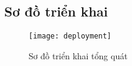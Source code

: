 \subsection{Sơ đồ triển khai}
\begin{figure}[h!]\fontsize{13px}{13px}\selectfont
	\begin{center}	
		\texttt{[image: deployment]}
		\caption{Sơ đồ triển khai tổng quát}
	\end{center}
\end{figure}
